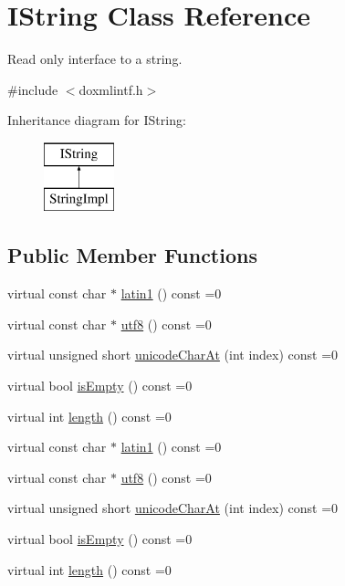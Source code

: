 \hypertarget{class_i_string}{}\section{I\+String Class Reference}
\label{class_i_string}


Read only interface to a string.  




{\ttfamily \#include $<$doxmlintf.\+h$>$}

Inheritance diagram for I\+String\+:\begin{figure}[H]
\begin{center}
\leavevmode
\includegraphics[height=2.000000cm]{class_i_string}
\end{center}
\end{figure}
\subsection*{Public Member Functions}
\begin{DoxyCompactItemize}
\item 
virtual const char $\ast$ \mbox{\hyperlink{class_i_string_aa4961cf1dde87d3308ec95430045b7db}{latin1}} () const =0
\item 
virtual const char $\ast$ \mbox{\hyperlink{class_i_string_a552cdb2900b094a432a8608df7bcce8c}{utf8}} () const =0
\item 
virtual unsigned short \mbox{\hyperlink{class_i_string_a7a3b84f1621cb087e22b4c8b4246b7d1}{unicode\+Char\+At}} (int index) const =0
\item 
virtual bool \mbox{\hyperlink{class_i_string_a85fee593e5cae3324834b6c02ceb6ae1}{is\+Empty}} () const =0
\item 
virtual int \mbox{\hyperlink{class_i_string_acbd29581b11e69494ce0141e2425071a}{length}} () const =0
\item 
virtual const char $\ast$ \mbox{\hyperlink{class_i_string_aa4961cf1dde87d3308ec95430045b7db}{latin1}} () const =0
\item 
virtual const char $\ast$ \mbox{\hyperlink{class_i_string_a552cdb2900b094a432a8608df7bcce8c}{utf8}} () const =0
\item 
virtual unsigned short \mbox{\hyperlink{class_i_string_a7a3b84f1621cb087e22b4c8b4246b7d1}{unicode\+Char\+At}} (int index) const =0
\item 
virtual bool \mbox{\hyperlink{class_i_string_a85fee593e5cae3324834b6c02ceb6ae1}{is\+Empty}} () const =0
\item 
virtual int \mbox{\hyperlink{class_i_string_acbd29581b11e69494ce0141e2425071a}{length}} () const =0
\end{DoxyCompactItemize}


